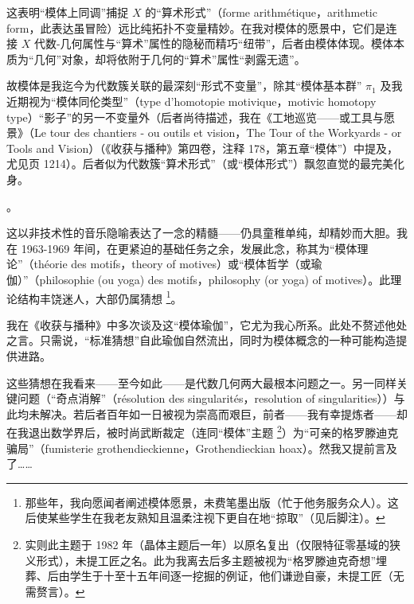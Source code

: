 {这表明“模体上同调”捕捉 $X$ 的“算术形式”（forme arithmétique，arithmetic form，此表达虽冒险）远比纯拓扑不变量精妙。在我对模体的愿景中，它们是连接 $X$ 代数-几何属性与“算术”属性的隐秘而精巧“纽带”，后者由模体体现。模体本质为“几何”对象，却将依附于几何的“算术”属性“剥露无遗”。

故模体是我迄今为代数簇关联的最深刻“形式不变量”，除其“模体基本群” $\pi_1$ 及我近期视为“模体同伦类型”（type d’homotopie motivique，motivic homotopy type）“影子”的另一不变量外（后者尚待描述，我在《工地巡览——或工具与愿景》（Le tour des chantiers - ou outils et vision，The Tour of the Workyards - or Tools and Vision）（《收获与播种》第四卷，注释 178，第五章“模体”）中提及，尤见页 1214）。后者似为代数簇“算术形式”（或“模体形式”）飘忽直觉的最完美化身。}。

这以非技术性的音乐隐喻表达了一念的精髓——仍具童稚单纯，却精妙而大胆。我在 1963-1969 年间，在更紧迫的基础任务之余，发展此念，称其为“模体理论”（théorie des motifs，theory of motives）或“模体哲学（或瑜伽）”（philosophie (ou yoga) des motifs，philosophy (or yoga) of motives）。此理论结构丰饶迷人，大部仍属猜想 \footnote{那些年，我向愿闻者阐述模体愿景，未费笔墨出版（忙于他务服务众人）。这后使某些学生在我老友熟知且温柔注视下更自在地“掠取”（见后脚注）。}。

我在《收获与播种》中多次谈及这“模体瑜伽”，它尤为我心所系。此处不赘述他处之言。只需说，“标准猜想”自此瑜伽自然流出，同时为模体概念的一种可能构造提供进路。

这些猜想在我看来——至今如此——是代数几何两大最根本问题之一。另一同样关键问题（“奇点消解”（résolution des singularités，resolution of singularities））与此均未解决。若后者百年如一日被视为崇高而艰巨，前者——我有幸提炼者——却在我退出数学界后，被时尚武断裁定（连同“模体”主题 \footnote{实则此主题于 1982 年（晶体主题后一年）以原名复出（仅限特征零基域的狭义形式），未提工匠之名。此为我离去后多主题被视为“格罗滕迪克奇想”埋葬、后由学生于十至十五年间逐一挖掘的例证，他们谦逊自豪，未提工匠（无需赘言）。}）为“可亲的格罗滕迪克骗局”（fumisterie grothendieckienne，Grothendieckian hoax）。然我又提前言及了……
